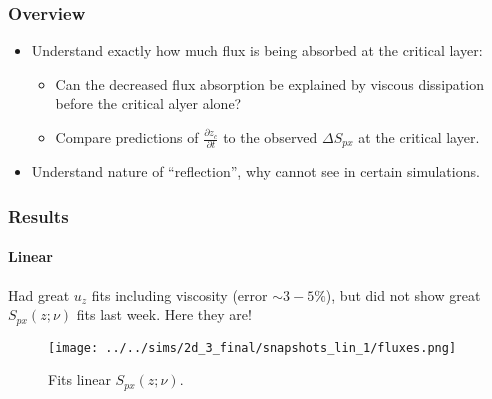 \documentclass[dvipsnames]{beamer}
\newcommand*{\pd}[2]{\frac{\partial#1}{\partial#2}}
\begin{document}
\begin{frame}
    \frametitle{Overview}

    \begin{itemize}
        \item Understand exactly how much flux is being absorbed at the critical
            layer:
            \begin{itemize}
                \item Can the decreased flux absorption be explained by
                    viscous dissipation before the critical alyer alone?

                \item Compare predictions of $\pd{z_c}{t}$ to the observed
                    $\Delta S_{px}$ at the critical layer.
            \end{itemize}

        \item Understand nature of ``reflection'', why cannot see in certain
            simulations.
    \end{itemize}
\end{frame}

\begin{frame}
    \frametitle{Results}
    \framesubtitle{Linear}

    Had great $u_z$ fits including viscosity (error $\sim 3-5\%$), but did not
    show great $S_{px}(z; \nu)$ fits last week. Here they are!
    \begin{figure}[t]
        \centering
        \texttt{[image: ../../sims/2d\_3\_final/snapshots\_lin\_1/fluxes.png]}
        \caption{Fits linear $S_{px}(z; \nu)$.}
    \end{figure}
\end{frame}
\end{document}
